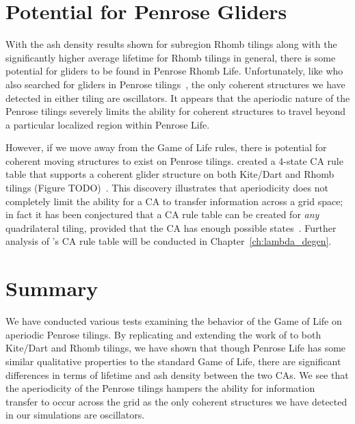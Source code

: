 \documentclass[a4paper,11pt,twoside]{report}
\begin{document}
\section{Potential for Penrose Gliders}
With the ash density results shown for subregion Rhomb tilings along with the significantly higher average lifetime for Rhomb tilings in general, there is some potential for gliders to be found in Penrose Rhomb Life. Unfortunately, like \citeauthor{ow10} who also searched for gliders in Penrose tilings~\cite{ow10}, the only coherent structures we have detected in either tiling are oscillators. It appears that the aperiodic nature of the Penrose tilings severely limits the ability for coherent structures to travel beyond a particular localized region within Penrose Life. 

However, if we move away from the Game of Life rules, there is potential for coherent moving structures to exist on Penrose tilings. \citeauthor{go12} created a 4-state CA rule table that supports a coherent glider structure on both Kite/Dart and Rhomb tilings (Figure TODO)~\cite{go12}. This discovery illustrates that aperiodicity does not completely limit the ability for a CA to transfer information across a grid space; in fact it has been conjectured that a CA rule table can be created for \textit{any} quadrilateral tiling, provided that the CA has enough possible states~\cite{mu16}. Further analysis of \citeauthor{go12}'s CA rule table will be conducted in Chapter~\ref{ch:lambda_degen}.

\section{Summary}
We have conducted various tests examining the behavior of the Game of Life on aperiodic Penrose tilings. By replicating and extending the work of \citeauthor{hi05} to both Kite/Dart and Rhomb tilings, we have shown that though Penrose Life has some similar qualitative properties to the standard Game of Life, there are significant differences in terms of lifetime and ash density between the two CAs. We see that the aperiodicity of the Penrose tilings hampers the ability for information transfer to occur across the grid as the only coherent structures we have detected in our simulations are oscillators. 
\end{document}
